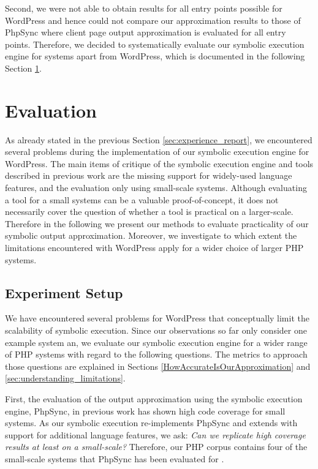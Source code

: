 \documentclass[sigconf, preprint]{acmart}
\renewcommand{\sf}[1]{\textsf{#1}}
\begin{document}
Second, we were not able to obtain results for all entry points possible for
\sf{WordPress} and hence could not compare our approximation results to those of
\sf{PhpSync} where client page output approximation is evaluated for all entry points. Therefore, we decided to
systematically evaluate our symbolic execution engine for systems apart from
\sf{WordPress}, which is documented in the following Section
\ref{sec:evaluation}.

\section{Evaluation} \label{sec:evaluation}
As already stated in the previous Section \ref{sec:experience_report}, we
encountered several problems during the implementation of our symbolic
execution engine for \sf{WordPress}. The main items of critique of the symbolic
execution engine and tools described in previous work
\cite{Nguyen:2011:AFH:2190078.2190142,Nguyen:2014:BCG:2635868.2635928,Nguyen:2015:CPS:2786805.2786872,Nguyen:2015:VIS:2819009.2819140}
are the missing support for widely-used language features, and the evaluation
only using small-scale systems. Although evaluating a tool for a small systems
can be a valuable proof-of-concept, it does not necessarily cover the question
of whether a tool is practical on a larger-scale. Therefore in the following we
present our methods to evaluate practicality of our symbolic output
approximation. Moreover, we investigate to which extent the limitations encountered
with \sf{WordPress} apply for a wider choice of larger PHP systems.

\subsection{Experiment Setup} \label{sec:experiment_setup}
We have encountered several problems for \sf{WordPress} that conceptually limit
the scalability of symbolic execution. Since our observations so far only consider
one example system an, we evaluate our symbolic execution engine for a wider
range of PHP systems with regard to the following questions. The metrics to
approach those questions are explained in Sections
\ref{HowAccurateIsOurApproximation} and \ref{sec:understanding_limitations}.

First, the evaluation of the output approximation using the symbolic execution
engine, \sf{PhpSync}, in previous work \cite{Nguyen:2014:BCG:2635868.2635928}
has shown high code coverage for small systems. As our symbolic execution
re-implements \sf{PhpSync} and extends with support for additional language
features, we ask: \textit{Can  we replicate high coverage results at least on a
small-scale?} Therefore, our PHP corpus contains four of the small-scale systems
that \sf{PhpSync} has been evaluated for \cite{Nguyen:2014:BCG:2635868.2635928}.
\end{document}
